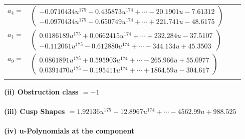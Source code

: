\documentclass[1p]{elsarticle_modified}
\theoremstyle{definition}
\begin{document}
\begin{tabular}{m{7pt} m{180pt} m{7pt} m{180pt} }
\flushright $a_{4}=$&$\begin{pmatrix}-0.0710434 u^{175}-0.435873 u^{174}+\cdots-20.1901 u-7.61312\\-0.0970434 u^{175}-0.650749 u^{174}+\cdots+221.741 u-48.6175\end{pmatrix}$ \\
\flushright $a_{1}=$&$\begin{pmatrix}0.0186189 u^{175}+0.0662415 u^{174}+\cdots+232.284 u-37.5107\\-0.112061 u^{175}-0.612880 u^{174}+\cdots-344.134 u+45.3503\end{pmatrix}$ \\
\flushright $a_{9}=$&$\begin{pmatrix}0.0861891 u^{175}+0.595903 u^{174}+\cdots-265.966 u+55.0977\\0.0391470 u^{175}-0.195411 u^{174}+\cdots+1864.59 u-304.617\end{pmatrix}$\\&\end{tabular}
\flushleft \textbf{(ii) Obstruction class $= -1$}\\~\\
\flushleft \textbf{(iii) Cusp Shapes $= 1.92136 u^{175}+12.8967 u^{174}+\cdots-4562.99 u+988.525$}\\~\\
\newpage\renewcommand{\arraystretch}{1}
\flushleft \textbf{(iv) u-Polynomials at the component}\newline \\
\end{document}
